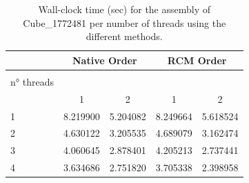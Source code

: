 \documentclass[hidelinks]{article}
\begin{document}
\begin{table}[H]
    \centering
    \begin{tabular}{ l  c c c c }
        \toprule
        & \multicolumn{2}{c}{Native Order} & \multicolumn{2}{c}{RCM Order} \\ \midrule
        \begin{minipage}[t][.75cm][t]{1.75cm}
        \raggedleft method \\
        \raggedright n° threads \\
        \end{minipage} & 1 & 2 		& 1 & 2 		\\ \midrule
        1  & 8.219900 & 5.204082 & 8.249664 & 5.618524   \\ 
        2  & 4.630122 & 3.205535 & 4.689079 & 3.162474   \\
        3  & 4.060645 & 2.878401 & 4.205213 & 2.737441   \\
        4  & 3.634686 & 2.751820 & 3.705338 & 2.398958   \\ \bottomrule
    \end{tabular}
    \caption{Wall-clock time (sec) for the assembly of Cube\_1772481 per number of threads using the different methods.}\label{tab:assemblytimes}
\end{table}
\end{document}
